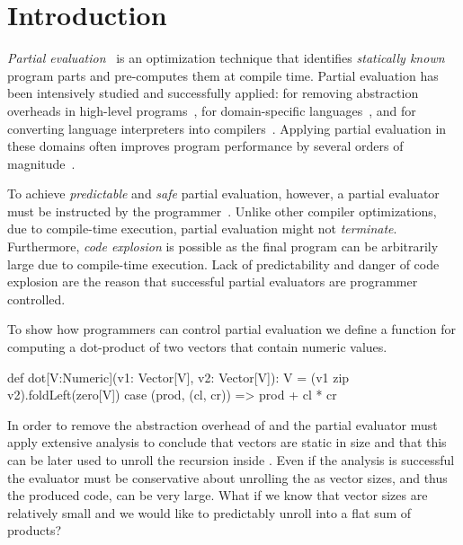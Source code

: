 \section{Introduction}
\label{sct:introduction}

\emph{Partial evaluation}~\cite{jones1993partial} is an optimization technique
that identifies \emph{statically known} program parts and pre-computes them at
compile time. Partial evaluation has been intensively studied and
successfully applied: for removing abstraction overheads in high-level
programs~\cite{carette2005multi,rompf2012lightweight}, for domain-specific
languages~\cite{brady2010,jonnalagedda2014staged}, and for converting language
interpreters into compilers~\cite{futamura1999partial,lancet,wurthinger2013one}.
Applying partial evaluation in these domains often improves program performance
by several orders of magnitude~\cite{shali2011Hybrid,brady2010}.


To achieve \emph{predictable} and \emph{safe} partial evaluation, however, a
partial evaluator must be instructed by the
programmer~\cite{brady2010,le2004specialization}. Unlike other compiler
optimizations, due to compile-time execution, partial evaluation might not
\emph{terminate}. Furthermore, \emph{code explosion} is possible as the final
program can be arbitrarily large due to compile-time execution. Lack of
predictability and danger of code explosion are the reason that successful
partial evaluators \cite{brady2010,taha_multi-stage_1997,rompf2012lightweight,wurthinger2013one}
are programmer controlled.

To show how programmers can control partial evaluation we define a function
 for computing a dot-product of two vectors that contain numeric
values.
\vspace{1.8mm}
\begin{listing}
  def dot[V:Numeric](v1: Vector[V], v2: Vector[V]): V =
    (v1 zip v2).foldLeft(zero[V]){ case (prod, (cl, cr)) =>
      prod + cl * cr
    }
\end{listing}
\vspace{1.8mm}

In order to remove the abstraction overhead of  and  the partial evaluator
must apply extensive analysis to conclude that vectors are static in size and
that this can be later used to unroll the recursion inside .
Even if the analysis is successful the evaluator must be conservative about
unrolling the  as vector sizes, and thus the produced code, can be
 very large. What if we know that vector sizes are relatively small and we would like to predictably unroll 
 into a flat sum of products?

